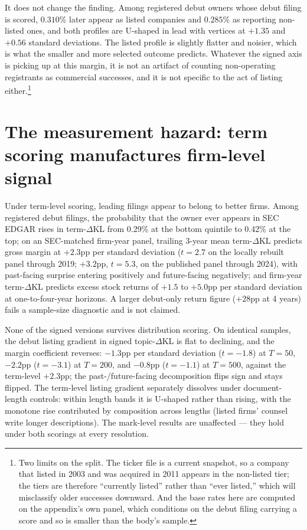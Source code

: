 \documentclass[11pt]{article}
\newcommand{\dkl}{$\Delta$KL}
\begin{document}
It does not change the finding. Among registered debut owners whose debut
filing is scored, $0.310$\% later appear as listed companies and $0.285$\% as
reporting non-listed ones, and both profiles are U-shaped in lead with vertices
at $+1.35$ and $+0.56$ standard deviations. The listed profile is slightly
flatter and noisier, which is what the smaller and more selected outcome
predicts. Whatever the signed axis is picking up at this margin, it is not an
artifact of counting non-operating registrants as commercial successes, and it
is not specific to the act of listing either.\footnote{Two limits on the split.
The ticker file is a current snapshot, so a company that listed in 2003 and was
acquired in 2011 appears in the non-listed tier; the tiers are therefore
``currently listed'' rather than ``ever listed,'' which will misclassify older
successes downward. And the base rates here are computed on the appendix's own
panel, which conditions on the debut filing carrying a score and so is smaller
than the body's sample.}

\section{The measurement hazard: term scoring manufactures firm-level signal}\label{app:hazard}

Under term-level scoring, leading filings appear to belong to
better firms. Among registered debut filings, the probability that the
owner ever appears in SEC EDGAR rises in term-\dkl{} from 0.29\% at the
bottom quintile to 0.42\% at the top; on an SEC-matched firm-year panel,
trailing 3-year mean term-\dkl{} predicts gross margin at $+2.3$pp per
standard deviation ($t = 2.7$ on the locally rebuilt panel through 2019; $+3.2$pp,
$t = 5.3$, on the published panel through 2024), with past-facing
surprise entering positively and future-facing negatively; and firm-year
term-\dkl{} predicts excess stock returns of $+1.5$ to $+5.0$pp per
standard deviation at one-to-four-year horizons. A larger debut-only return figure
($+28$pp at 4 years) fails a sample-size diagnostic and is not claimed.

None of the signed versions survives distribution scoring. On identical
samples, the debut listing gradient in signed topic-\dkl{} is flat to
declining, and the margin coefficient reverses: $-1.3$pp per standard deviation
($t = -1.8$) at $T = 50$, $-2.2$pp ($t = -3.1$) at $T = 200$, and
$-0.8$pp ($t = -1.1$) at $T = 500$, against the term-level $+2.3$pp;
the past-/future-facing decomposition flips sign and stays
flipped. The term-level listing gradient separately dissolves under
document-length controls: within length bands it is U-shaped rather than
rising, with the monotone rise contributed by composition across lengths
(listed firms' counsel write longer descriptions). The mark-level
results are unaffected --- they hold under both scorings at every
resolution.
\end{document}

